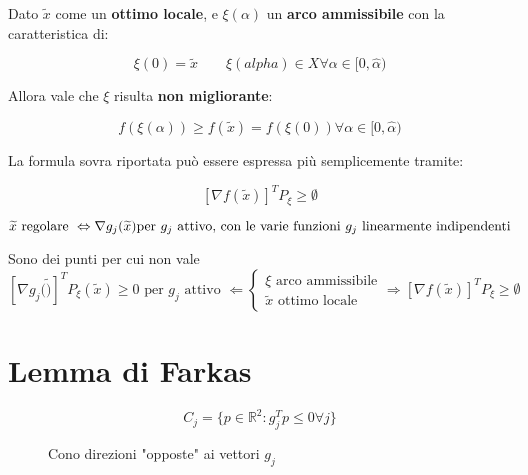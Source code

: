 \documentclass[\main/main.tex]{subfiles}
\begin{document}
Dato $\widetilde{x}$ come un \textbf{ottimo locale}, e $\xi(\alpha)$ un \textbf{arco ammissibile} con la caratteristica di:

\[
	\xi(0) = \widetilde{x} \qquad
	\xi(alpha) \in X \forall \alpha \in [0, \widehat{\alpha})
\]

Allora vale che $\xi$ risulta \textbf{non migliorante}:

\[
	f(\xi(\alpha)) \geq f(\widetilde{x}) = f(\xi(0)) \forall \alpha \in [0, \widehat{\alpha})
\]

La formula sovra riportata può essere espressa più semplicemente tramite:

\[
	[\nabla f(\widetilde{x})]^T P_{\xi} \geq \emptyset
\]

\begin{definition}
	\[
		\widetilde{x} \text{ regolare } \Leftrightarrow \nabla g_j (\widetilde{x}) \text{per $ g_j$ attivo, con le varie funzioni $g_j$ linearmente indipendenti}
	\]
\end{definition}

\begin{definition}
	Sono dei punti per cui non vale
	\[
		[\nabla g_j (\widetilde)]^T P_\xi (\widetilde{x}) \geq 0 \text{ per $g_j$ attivo } \Leftarrow 	\begin{cases}
			\xi \text{ arco ammissibile}        \\
			\widetilde{x} \text{ ottimo locale}
		\end{cases}
		\Rightarrow
		[\nabla f(\widetilde{x})]^T P_{\xi} \geq \emptyset
	\]
\end{definition}

\begin{center}
\end{center}

\section{Lemma di Farkas}

\begin{figure}[H]
	\[
		C_j = \{ p \in \mathbb{R}^2: g_j^T p \leq 0 \forall j \}
	\]
	\caption{Cono direzioni "opposte" ai vettori $g_j$}
\end{figure}
\end{document}
